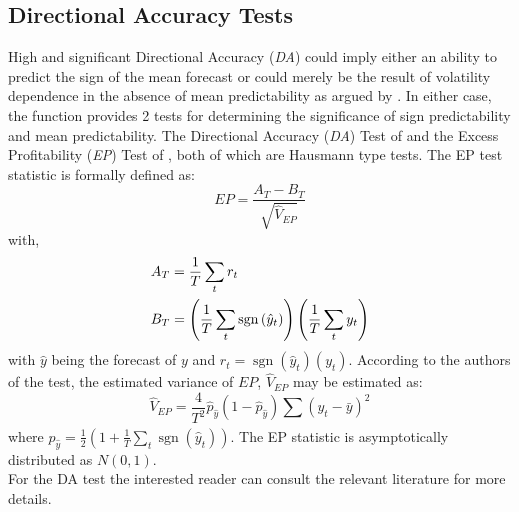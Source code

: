 \subsection{Directional Accuracy Tests}
High and significant Directional Accuracy (\emph{DA}) could imply either an
ability to predict the sign of the mean forecast or could merely be the result
of volatility dependence in the absence of mean predictability as argued by
\cite{Christoffersen2006}. In either case, the function \verb@DACTest@ provides 2
tests for determining the significance of sign predictability and mean predictability.
The Directional Accuracy (\emph{DA}) Test of \cite{Pesaran1992} and the Excess
Profitability (\emph{EP}) Test of \cite{Anatolyev2005}, both of which are
Hausmann  type tests. The EP test statistic is formally defined as:
\begin{equation}
EP = \frac{{{A_T} - {B_T}}}{{\sqrt {{{\hat V}_{EP}}} }}
\end{equation}
with,
\begin{equation}
\begin{gathered}
  {A_T} = \frac{1}
{T}\sum\limits_t {{r_t}}  \hfill \\
  {B_T} = \left( {\frac{1}
{T}\sum\limits_t {\operatorname{sgn} \left( {{{\hat y}_t}} \right)} } \right)\left( {\frac{1}
{T}\sum\limits_t {{y_t}} } \right) \hfill \\
\end{gathered}
\end{equation}
with $\hat y$ being the forecast of $y$ and $r_{t}=\operatorname{sgn}(\hat y_t)(y_t)$.
According to the authors of the test, the estimated variance of $EP$, $\hat V_{EP}$
may be estimated as:
\begin{equation}
{{\hat V}_{EP}} = \frac{4}{{{T^2}}}{{\hat p}_{\hat y}}\left( {1 - {{\hat p}_{\hat y}}} \right)\sum\limits_{} {{{\left( {{y_t} - \bar y} \right)}^2}}
\end{equation}
where ${\hat p_{\hat y}} = \frac{1}{2}\left( {1 + \frac{1}{T}\sum\limits_t {\operatorname{sgn} \left( {{{\hat y}_t}} \right)} } \right)$. The EP statistic is asymptotically distributed as $N(0,1)$.\\
For the DA test the interested reader can consult the relevant literature for more details.
